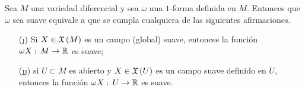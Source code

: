 \begin{propoUnoFormasSuaves}\label{thm:unoformassuavescampos}
	Sea $M$ una variedad diferencial y sea $\omega$ una $1$-forma
	definida en $M$. Entonces que $\omega$ sea suave equivale a que
	se cumpla cualquiera de las siguientes afirmaciones.
	\begin{itemize}
		\item[(\j)] Si $X\in\mathfrak{X}\left(M\right)$ es un campo (global) suave,
			entonces la funci\'{o}n $\omega X:%
			\,M\rightarrow\bb{R}$ es suave;
		\item[(\j\j)] si $U\subset M$ es abierto y $X\in\mathfrak{X}\left(U\right)$
			es un campo suave definido en $U$, entonces
			la funci\'{o}n $\omega X:\,U\rightarrow\mathbb{R}$ es
			suave.
	\end{itemize}
\end{propoUnoFormasSuaves}

